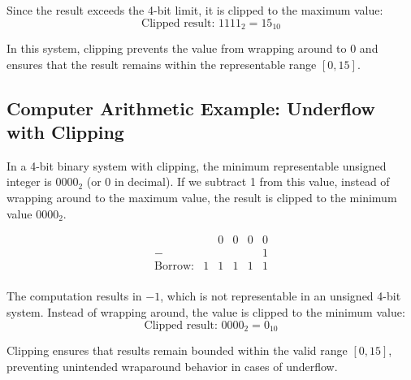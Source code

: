 Since the result exceeds the 4-bit limit, it is clipped to the maximum value:
\[
\text{Clipped result: } 1111_2 = 15_{10}
\]

In this system, clipping prevents the value from wrapping around to 0 and ensures that the result remains within the representable range \( [0, 15] \).

\subsection{Computer Arithmetic Example: Underflow with Clipping} \label{subsub:underflow_clipping_example}
In a 4-bit binary system with clipping, the minimum representable unsigned integer is \( 0000_2 \) (or 0 in decimal). If we subtract 1 from this value, instead of wrapping around to the maximum value, the result is clipped to the minimum value \( 0000_2 \).

\[
\begin{array}{rccccc}
       &   & 0 & 0 & 0 & 0 \\ %
    -  &   &   &   &   & 1 \\ %
    \hline
\text{Borrow:} & 1 & 1 & 1 & 1 & 1 \\ %
\end{array}
\]

The computation results in \( -1 \), which is not representable in an unsigned 4-bit system. Instead of wrapping around, the value is clipped to the minimum value:
\[
\text{Clipped result: } 0000_2 = 0_{10}
\]

Clipping ensures that results remain bounded within the valid range \( [0, 15] \), preventing unintended wraparound behavior in cases of underflow.


